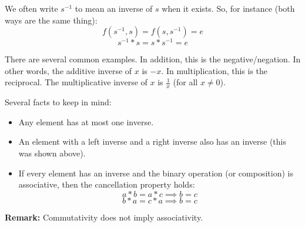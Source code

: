 \documentclass[letterpaper]{article}
\begin{document}
\begin{itemize}
    \bigskip 

    We often write $s^{-1}$ to mean an inverse of $s$ when it exists. So, for instance (both ways are the same thing): 
    \[f(s^{-1}, s) = f(s, s^{-1}) = e\]
    \[s^{-1} * s = s * s^{-1} = e\]

    \bigskip 

    There are several common examples. In addition, this is the negative/negation. In other words, the additive inverse of $x$ is $-x$. In multiplication, this is the reciprocal. The multiplicative inverse of $x$ is $\frac{1}{x}$ (for all $x \neq 0$). 
    
    \bigskip 
    
    Several facts to keep in mind: 
    \begin{itemize}
        \item Any element has at most one inverse. 
        \item An element with a left inverse and a right inverse also has an inverse (this was shown above). 
        \item If every element has an inverse and the binary operation (or composition) is associative, then the cancellation property holds: 
        \[a * b = a * c \implies b = c\]
        \[b * a = c * a \implies b = c\]
    \end{itemize}
\end{itemize}

\textbf{Remark:} Commutativity does not imply associativity.
\end{document}
